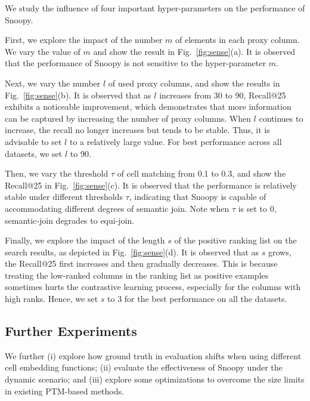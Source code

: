 We study the influence of four important hyper-parameters on the performance of \textsf{Snoopy}.



First, we explore the impact of the number $m$ of elements in each proxy column. We vary the value of $m$ and show the result in Fig.~\ref{fig:sense}(a).
It is observed that the performance of \textsf{Snoopy} is not sensitive to the hyper-parameter $m$. 


Next, we vary the number $l$ of used proxy columns, and show the results in Fig.~\ref{fig:sense}(b).
It is observed that as $l$ increases from 30 to 90, Recall@25  exhibits a noticeable improvement, which demonstrates that more information can be captured by increasing the number of proxy columns. When $l$ continues to increase, the recall no longer increases but tends to be stable. Thus, it is advisable to set $l$ to a relatively large value. For best performance across all datasets, we set $l$ to 90.


Then, we vary the threshold $\tau$ of cell matching from 0.1 to 0.3, and show the Recall@25 in Fig.~\ref{fig:sense}(c). It is observed that the performance is relatively stable under different thresholds $\tau$,  indicating that \textsf{Snoopy} is capable of accommodating different degrees of semantic join. Note when $\tau$ is set to 0, semantic-join degrades to equi-join.

Finally, we explore the impact of the length $s$ of the positive ranking list on the search results, as depicted in Fig.~\ref{fig:sense}(d). It is observed that as $s$ grows, the Recall@25 first increases and then gradually decreases. This is because treating the low-ranked columns in the ranking list as positive examples sometimes hurts the contrastive learning process, especially for the columns with high ranks. Hence, we set $s$ to 3 for the best performance on all the datasets.

\subsection{ Further Experiments} 
\label{subsec:further_exp}
We further (i) explore how ground truth in evaluation shifts when using different cell embedding functions; (ii) evaluate the effectiveness of \textsf{Snoopy} under the dynamic scenario; and (iii) explore some optimizations to overcome the size limits in existing PTM-based methods.
 



